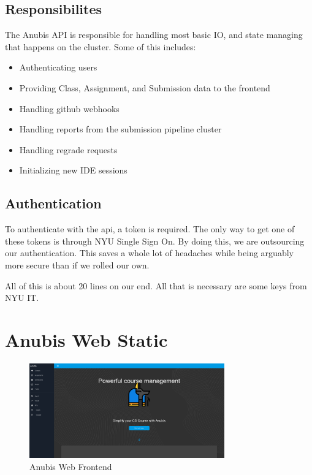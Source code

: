 \subsection{Responsibilites}\label{sec:api-responsibilities}

The Anubis API is responsible for handling most basic 
IO, and state managing that happens on the cluster. 
Some of this includes:

\begin{itemize}
    \item Authenticating users
    \item Providing Class, Assignment, and Submission data to the frontend
    \item Handling github webhooks
    \item Handling reports from the submission pipeline cluster
    \item Handling regrade requests
    \item Initializing new IDE sessions
\end{itemize}

\subsection{Authentication}\label{sec:api-authentication}

To authenticate with the api, a token is required.
The only way to get one of these tokens is through NYU Single Sign On. 
By doing this, we are outsourcing our authentication. 
This saves a whole lot of headaches while being arguably more secure than if we rolled our own.

All of this is about 20 lines on our end. All that is necessary are some keys from NYU IT.

\section{Anubis Web Static}\label{sec:web}

\begin{figure}[ht]
    \centering
    \includegraphics[width=0.75\textwidth]{figures/anubis-frontend}
    \caption{Anubis Web Frontend\label{fig:web-frontend}}
\end{figure}

